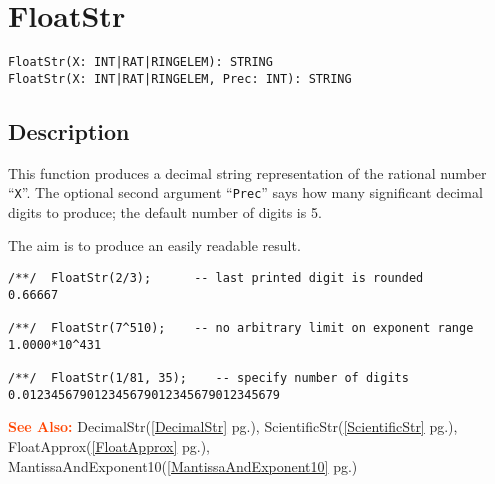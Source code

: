 \documentclass[a4paper]{mybook}
\newenvironment{command}{}{} %
\newcommand\SeeAlso{\par\textcolor{OrangeRed}{\textbf{\large See Also: }}}
\begin{document}
\section{FloatStr}
\label{FloatStr}
\begin{command} %


\begin{Verbatim}[label=syntax, rulecolor=\color{MidnightBlue},
frame=single]
FloatStr(X: INT|RAT|RINGELEM): STRING
FloatStr(X: INT|RAT|RINGELEM, Prec: INT): STRING
\end{Verbatim}


\subsection*{Description}

This function produces a decimal string representation of the rational
number ``\verb&X&''.  The optional second argument ``\verb&Prec&'' says how many
significant decimal digits to produce; the default number of digits is 5.

The aim is to produce an easily readable result.
\begin{Verbatim}[label=example, rulecolor=\color{PineGreen}, frame=single]
/**/  FloatStr(2/3);      -- last printed digit is rounded
0.66667

/**/  FloatStr(7^510);    -- no arbitrary limit on exponent range
1.0000*10^431

/**/  FloatStr(1/81, 35);    -- specify number of digits
0.012345679012345679012345679012345679
\end{Verbatim}


\SeeAlso %
  DecimalStr(\ref{DecimalStr} pg.\pageref{DecimalStr}), 
    ScientificStr(\ref{ScientificStr} pg.\pageref{ScientificStr}), 
    FloatApprox(\ref{FloatApprox} pg.\pageref{FloatApprox}), 
    MantissaAndExponent10(\ref{MantissaAndExponent10} pg.\pageref{MantissaAndExponent10})
\end{command} %
\end{document}
